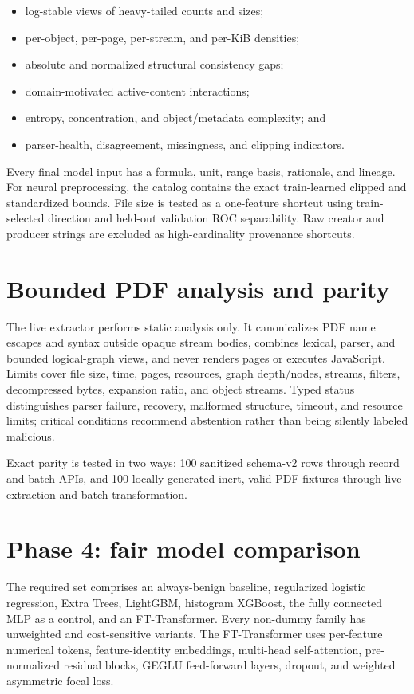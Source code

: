 \documentclass[11pt,a4paper]{article}
\begin{document}
\begin{itemize}
  \item log-stable views of heavy-tailed counts and sizes;
  \item per-object, per-page, per-stream, and per-KiB densities;
  \item absolute and normalized structural consistency gaps;
  \item domain-motivated active-content interactions;
  \item entropy, concentration, and object/metadata complexity; and
  \item parser-health, disagreement, missingness, and clipping indicators.
\end{itemize}

Every final model input has a formula, unit, range basis, rationale, and lineage.
For neural preprocessing, the catalog contains the exact train-learned clipped
and standardized bounds. File size is tested as a one-feature shortcut using
train-selected direction and held-out validation ROC separability. Raw creator
and producer strings are excluded as high-cardinality provenance shortcuts.

\section{Bounded PDF analysis and parity}

The live extractor performs static analysis only. It canonicalizes PDF name
escapes and syntax outside opaque stream bodies, combines lexical, parser, and
bounded logical-graph views, and never renders pages or executes JavaScript.
Limits cover file size, time, pages, resources, graph depth/nodes, streams,
filters, decompressed bytes, expansion ratio, and object streams. Typed status
distinguishes parser failure, recovery, malformed structure, timeout, and
resource limits; critical conditions recommend abstention rather than being
silently labeled malicious.

Exact parity is tested in two ways: 100 sanitized schema-v2 rows through record
and batch APIs, and 100 locally generated inert, valid PDF fixtures through live
extraction and batch transformation.

\section{Phase 4: fair model comparison}

The required set comprises an always-benign baseline, regularized logistic
regression, Extra Trees, LightGBM, histogram XGBoost, the fully connected MLP as
a control, and an FT-Transformer. Every non-dummy family has unweighted and
cost-sensitive variants. The FT-Transformer uses per-feature numerical tokens,
feature-identity embeddings, multi-head self-attention, pre-normalized residual
blocks, GEGLU feed-forward layers, dropout, and weighted asymmetric focal loss.
\end{document}
